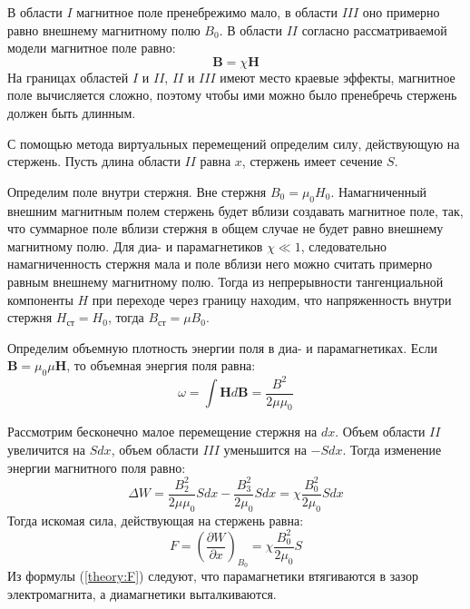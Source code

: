 В области $I$ магнитное поле пренебрежимо мало, в области $III$ оно примерно равно внешнему магнитному полю $B_0$. В области $II$ согласно рассматриваемой модели магнитное поле равно:
$$
\boldsymbol{B} = \chi \boldsymbol{H}
$$
На границах областей $I$ и $II$, $II$ и $III$ имеют место краевые эффекты, магнитное поле вычисляется сложно, поэтому чтобы ими можно было пренебречь стержень должен быть длинным.

С помощью метода виртуальных перемещений определим силу, действующую на стержень. Пусть длина области $II$ равна $x$, стержень имеет сечение $S$.

Определим поле внутри стержня. Вне стержня $B_0 = \mu_0 H_0$. Намагниченный внешним магнитным полем стержень будет вблизи создавать магнитное поле, так, что суммарное поле вблизи стержня в общем случае не будет равно внешнему магнитному полю. Для диа- и парамагнетиков $\chi \ll 1$, следовательно намагниченность стержня мала и поле вблизи него можно считать примерно равным внешнему магнитному полю. Тогда из непрерывности тангенциальной компоненты $H$ при переходе через границу находим, что напряженность внутри стержня $H_{ст} = H_0$, тогда $B_{ст} = \mu B_0$.

Определим объемную плотность энергии поля в диа- и парамагнетиках. Если $\boldsymbol{B} = \mu_0 \mu \boldsymbol{H}$, то объемная энергия поля равна:
$$
\omega = \int{\boldsymbol{H} d\boldsymbol{B}} = \frac{B^2}{2 \mu \mu_0}
$$

Рассмотрим бесконечно малое перемещение стержня на $dx$. Объем области $II$ увеличится на $S dx$, объем области $III$ уменьшится на $- S dx$. Тогда изменение энергии магнитного поля равно:
$$
\Delta W = \frac{B_2^2}{2 \mu \mu_0} S dx - \frac{B_3^2}{2 \mu_0} S dx = \chi \frac{B_0^2}{2 \mu_0} S dx
$$
Тогда искомая сила, действующая на стержень равна:
\begin{equation}
	F = \left( \frac{\partial W}{\partial x} \right)_{B_0} = \chi \frac{B_0^2}{2 \mu_0} S
	\label{theory:F}
\end{equation}
Из формулы (\ref{theory:F}) следуют, что парамагнетики втягиваются в зазор электромагнита, а диамагнетики выталкиваются.
